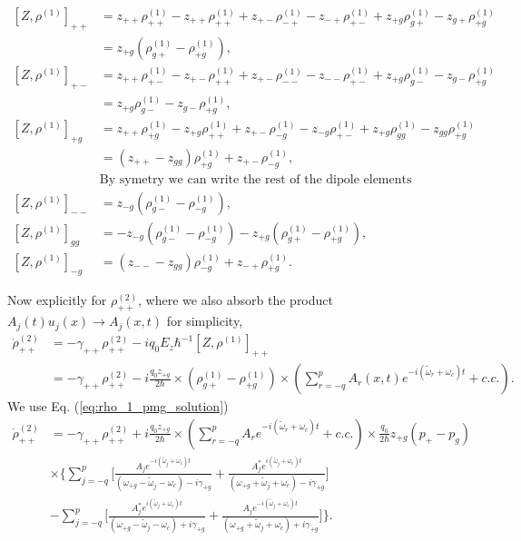 \documentclass[preprint,secnumarabic,amssymb, nobibnotes, aip, prd]{revtex4-1}
\def\tw{\tilde{\omega}}
\def\tw{\tilde{\omega}}
\begin{document}
	\begin{subequations}
		\label{eq:Z_rho_1_commutators}
		\begin{align}
		[Z,\rho^{(1)}]_{++} &= z_{++}\rho_{++}^{(1)} - z_{++}\rho_{++}^{(1)} + z_{+-}\rho_{-+}^{(1)} - z_{-+}\rho_{+-}^{(1)} + z_{+g}\rho_{g+}^{(1)} - z_{g+}\rho_{+g}^{(1)} \nonumber \\
		&=  z_{+g}(\rho_{g+}^{(1)} - \rho_{+g}^{(1)}), \\
		[Z,\rho^{(1)}]_{+-} &= z_{++}\rho_{+-}^{(1)} - z_{+-}\rho_{++}^{(1)} + z_{+-}\rho_{--}^{(1)} - z_{--}\rho_{+-}^{(1)} + z_{+g}\rho_{g-}^{(1)} - z_{g-}\rho_{+g}^{(1)} \nonumber \\
		&= z_{+g}\rho_{g-}^{(1)} - z_{g-}\rho_{+g}^{(1)}, \\
		[Z,\rho^{(1)}]_{+g} &= z_{++}\rho_{+g}^{(1)} - z_{+g}\rho_{++}^{(1)} + z_{+-}\rho_{-g}^{(1)} - z_{-g}\rho_{+-}^{(1)} + z_{+g}\rho_{gg}^{(1)} - z_{gg}\rho_{+g}^{(1)} \nonumber \\
		&= (z_{++}- z_{gg})\rho_{+g}^{(1)} + z_{+-}\rho_{-g}^{(1)}, \\
		&\text{By symetry we can write the rest of the dipole elements} \nonumber \\
		[Z,\rho^{(1)}]_{--} &=z_{-g}(\rho_{g-}^{(1)} - \rho_{-g}^{(1)}), \\
		[Z,\rho^{(1)}]_{gg} &= - z_{-g}(\rho_{g-}^{(1)} - \rho_{-g}^{(1)}) - z_{+g}(\rho_{g+}^{(1)} - \rho_{+g}^{(1)}),  \\
		[Z,\rho^{(1)}]_{-g} &=  (z_{--}- z_{gg})\rho_{-g}^{(1)}+ z_{-+}\rho_{+g}^{(1)}.
		\end{align}
	\end{subequations}
	
	Now explicitly for $\rho_{++}^{(2)}$, where we also absorb the product $A_j(t)u_j(x)\rightarrow A_j(x,t)$ for simplicity, 
	\begin{align}
	\dot{\rho}_{++}^{(2)} &= -\gamma_{++}\rho_{++}^{(2)}  - i q_0E_z\hbar^{-1}[Z,\rho^{(1)}]_{++}\nonumber \\
	&= -\gamma_{++}\rho_{++}^{(2)} -i\frac{q_0z_{+g}}{2\hbar}\times (\rho_{g+}^{(1)} - \rho_{+g}^{(1)})\times (\sum_{r=-q}^{p} A_r(x,t) e^{-i(\tw_r+\omega_c) t } + c.c.).
	\end{align}
	We use Eq. (\ref{eq:rho_1_pmg_solution})
	\begin{align}
	\dot{\rho}_{++}^{(2)} &= -\gamma_{++}\rho_{++}^{(2)} +i\frac{q_0z_{+g}}{2\hbar}\times (\sum_{r=-q}^{p} A_r e^{-i(\tw_r+\omega_c) t } + c.c.) \times \frac{q_0}{2\hbar}z_{+g}(p_+-p_g)\nonumber \\
	&\times \Big \{ 
	\sum_{j=-q}^{p} \Big [\frac{A_j e^{-i(\tw_j+\omega_c)t}}{( \omega_{+ g} - \tw_j-\omega_c) -i\gamma_{+ g}} +\frac{A_j^* e^{i(\tw_j+\omega_c)t}}{( \omega_{+ g} + \tw_j+\omega_c) -i\gamma_{+ g}}
	\Big ] 
	\nonumber \\
	&- \sum_{j=-q}^{p} \Big [\frac{A_j^* e^{i(\tw_j+\omega_c)t}}{( \omega_{+ g} - \tw_j-\omega_c) +i\gamma_{+ g}} +\frac{A_j e^{-i(\tw_j+\omega_c)t}}{( \omega_{+ g} + \tw_j+\omega_c) +i\gamma_{+ g}}
	\Big ]
	\Big \}. 
	\end{align}
	
\end{document}
